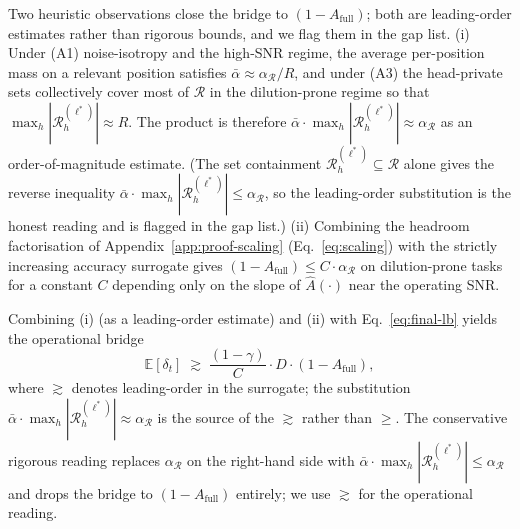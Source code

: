 \documentclass{article}
\begin{document}
Two heuristic observations close the bridge to $(1 - A_{\mathrm{full}})$;
both are leading-order estimates rather than rigorous bounds, and we
flag them in the gap list.
(i) Under (A1) noise-isotropy and the high-SNR regime, the average
per-position mass on a relevant position satisfies $\bar\alpha \approx
\alpha_{\mathcal{R}} / R$, and under (A3) the head-private sets
collectively cover most of $\mathcal{R}$ in the dilution-prone regime so
that $\max_h |\mathcal{R}^{(\ell^*)}_h| \approx R$. The product is
therefore $\bar\alpha \cdot \max_h |\mathcal{R}^{(\ell^*)}_h| \approx
\alpha_{\mathcal{R}}$ as an order-of-magnitude estimate. (The set
containment $\mathcal{R}^{(\ell^*)}_h \subseteq \mathcal{R}$ alone gives
the reverse inequality $\bar\alpha \cdot \max_h |\mathcal{R}^{(\ell^*)}_h|
\leq \alpha_{\mathcal{R}}$, so the leading-order substitution is the
honest reading and is flagged in the gap list.)
(ii) Combining the headroom factorisation of
Appendix~\ref{app:proof-scaling} (Eq.~\eqref{eq:scaling}) with the
strictly increasing accuracy surrogate gives $(1 - A_{\mathrm{full}})
\leq C \cdot \alpha_{\mathcal{R}}$ on dilution-prone tasks for a
constant $C$ depending only on the slope of $\hat A(\cdot)$ near the
operating SNR.

Combining (i) (as a leading-order estimate) and (ii) with
Eq.~\eqref{eq:final-lb} yields the operational bridge
\begin{equation}
\label{eq:bridge-final}
\mathbb{E}[\delta_t]
\;\gtrsim\;
\frac{(1 - \gamma)}{C} \cdot D \cdot (1 - A_{\mathrm{full}}),
\end{equation}
where $\gtrsim$ denotes leading-order in the surrogate; the substitution
$\bar\alpha \cdot \max_h |\mathcal{R}^{(\ell^*)}_h| \approx
\alpha_{\mathcal{R}}$ is the source of the $\gtrsim$ rather than $\geq$.
The conservative rigorous reading replaces $\alpha_{\mathcal{R}}$ on the
right-hand side with $\bar\alpha \cdot \max_h |\mathcal{R}^{(\ell^*)}_h|
\leq \alpha_{\mathcal{R}}$ and drops the bridge to $(1 - A_{\mathrm{full}})$
entirely; we use $\gtrsim$ for the operational reading.
\end{document}
